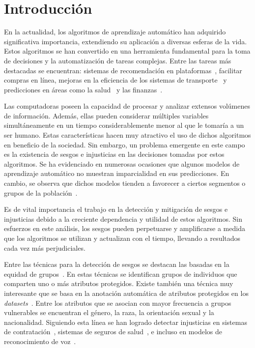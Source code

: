 \chapter*{Introducción}\label{chapter:introduction}
En la actualidad, los algoritmos de aprendizaje autom\'atico han adquirido significativa importancia, extendiendo su aplicaci\'on a 
diversas esferas de la vida. Estos algoritmos se han convertido en una herramienta fundamental para la toma de decisiones y la 
automatizaci\'on de tareas complejas. Entre las tareas m\'as destacadas se encuentran: sistemas de recomendaci\'on en 
plataformas~\parencite{esmaeilzadeh2022abuse, bhattacharya2022augmenting}, facilitar compras en l\'inea, mejoras en la eficiencia 
de los sistemas de transporte~\parencite{autonomous_driving} y predicciones en \'areas como la salud~\parencite{roy2023machine} y 
las finanzas~\parencite{sen2021machine}.

Las computadoras poseen la capacidad de procesar y analizar extensos vol\'umenes de informaci\'on. Adem\'as, ellas pueden considerar 
m\'ultiples variables simult\'aneamente en un tiempo considerablemente menor al que le tomar\'ia a un ser humano. Estas caracter\'isticas 
hacen muy atractivo el uso de dichos algoritmos en beneficio de la sociedad. Sin embargo, un problema emergente en este campo es la 
existencia de sesgos e injusticias en las decisiones tomadas por estos algoritmos. Se ha evidenciado en numerosas ocasiones que algunos 
modelos de aprendizaje autom\'atico no muestran imparcialidad en sus predicciones. En cambio, se observa que dichos modelos tienden a 
favorecer a ciertos segmentos o grupos de la poblaci\'on~\parencite{survey}.

Es de vital importancia el trabajo en la detecci\'on y mitigaci\'on de sesgos e injusticias debido a la creciente dependencia y 
utilidad de estos algoritmos. Sin esfuerzos en este an\'alisis, los sesgos pueden perpetuarse y amplificarse a medida 
que los algoritmos se utilizan y actualizan con el tiempo, llevando a resultados cada vez m\'as perjudiciales.

Entre las t\'ecnicas para la detecci\'on de sesgos se destacan las basadas en la equidad de grupos~\parencite{fairmodels}. 
En estas t\'ecnicas se identifican grupos de individuos que comparten uno o m\'as atributos protegidos. Existe tambi\'en una 
t\'ecnica muy interesante que se basa en la anotaci\'on autom\'atica de atributos protegidos en los 
\emph{datasets}~\parencite{soumah2023radar,dinan2020multidimensional,10.1007/978-3-031-35320-8_39}. Entre los atributos que se asocian 
con mayor frecuencia a grupos vulnerables se encuentran el g\'enero, la raza, la orientaci\'on sexual y la nacionalidad. 
Siguiendo esta l\'inea se han logrado detectar injusticias en sistemas de contrataci\'on~\parencite{examples_dis}, sistemas de 
seguros de salud~\parencite{examples_dis}, e incluso en modelos de reconocimiento de voz~\parencite{voice_bias}.

